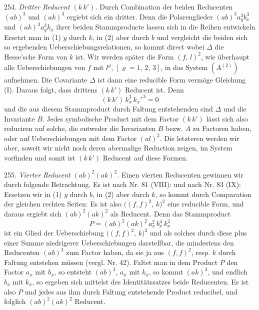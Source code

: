 254. \textit{Dritter Reducent $(k\,k')$.} Durch Combination der beiden
Reducenten $(ab)^3$ und $(ak)^3$ ergiebt sich ein dritter. Denn die
Polarenglieder $(ab)^3 a_y^3 b_x^3$ und $(ak)^3 a_y^3 k_x$ ihrer beiden
Stammproducte lassen sich in die Reihen entwickeln
Ersetzt man in (1) $\dot{y}$ durch $k$, in (2) aber durch $b$ und
vergleicht die beiden sich so ergebenden Ueberschiebungsrelationen, so
kommt direct
wobei $\varDelta$ die Hesse'sche Form von $k$ ist. Wir werden später die
Form $(f,\,l)^2$, wie überhaupt alle Ueberschiebungen von $f$ mit
$l^\varrho$, $[\varrho = 1,\,2,\,3]$, in das System $(A^{(2)})$ aufnehmen.
Die Covariante $\varDelta$ ist dann eine reducible Form vermöge Gleichung
(I). Daraus folgt, dass drittens $(k\,k')$ Reducent ist. Denn
\[
(k\,k')\,k_x^3\,k_x'^{\,3} = 0
\]
und die aus diesem Stammproduct durch Faltung entstehenden sind
$\varDelta$ und die Invariante $B$. Jedes symbolische Product mit dem
Factor $(k\,k')$ lässt sich also reduciren auf solche, die entweder die
Invarianten $B$ bezw. $A$ zu Factoren haben, oder auf Ueberschiebungen
mit dem Factor $(al)^2$. Die letzteren werden wir aber, soweit wir nicht
noch deren abermalige Reduction zeigen, im System vorfinden und somit
ist $(k\,k')$ Reducent auf diese Formen.



255. \textit{Vierter Reducent $(ab)^2(ak)^2$.} Einen vierten Reducenten
gewinnen wir durch folgende Betrachtung. Es ist nach Nr. 81 (VIII):
und nach Nr. 83 (IX):
Ersetzen wir in (1) $y$ durch $b$, in (2) aber durch $k$, so kommt durch
Comparation der gleichen rechten Seiten:
Es ist also $\big((f,f)^2,\,k\big)^2$ eine reducible Form, und daraus
ergiebt sich $(ab)^2(ak)^2$ als Reducent. Denn das Stammproduct
\[
P = (ab)^2(ak)^2\,a_x^2\,b_x^4\,k_x^2
\]
ist ein Glied der Ueberschiebung $\big((f,f)^2,\,k\big)^2$ und als
solches durch diese plus einer Summe niedrigerer Ueberschiebungen
darstellbar, die mindestens den Reducenten $(ab)^3$ zum Factor haben,
da sie ja aus $(f,f)^2$, resp. $k$ durch Faltung entstehen müssen (vergl.
Nr. 42). Faltet man in dem Product $P$ den Factor $a_x$ mit $b_x$, so
entsteht $(ab)^3$, $a_x$ mit $k_x$, so kommt $(ak)^3$, und endlich $b_x$
mit $k_x$, so ergeben sich mittelst des Identitätssatzes beide
Reducenten. Es ist also $P$ und jedes aus ihm durch Faltung entstehende
Product reducibel, und folglich $(ab)^2(ak)^2$ Reducent.

